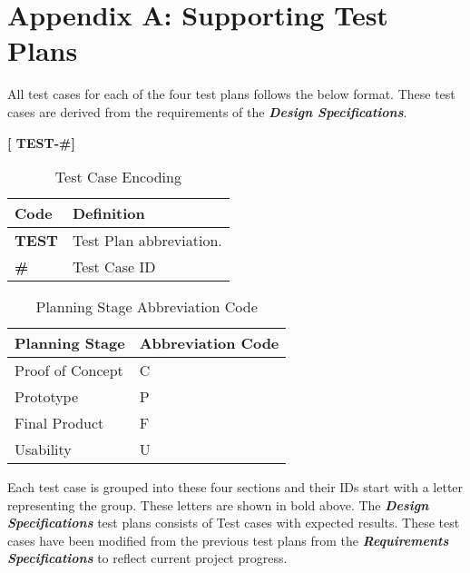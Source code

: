 

\setcounter{section}{8}
\section{Appendix A: Supporting Test Plans}
\bigskip


All test cases for each of the four test plans follows the below format. These test cases are derived from the 
requirements of the \textbf{\textit{Design Specifications}}.
\medskip
\begin{center}
	\textbf{[ TEST-\#]} 
\end{center}


\bgroup
\def\arraystretch{1.5}
\begin{table}[H]
\centering
\begin{tabular}{ | m{1cm} | m{13cm}| } 
\hline
\rowcolor{lightgray} \textbf{Code} & \textbf{Definition} \\ 
\hline
 \textbf{TEST} & Test Plan abbreviation. \\ 
\hline
 \textbf{\#} & Test Case ID \\ 
\hline
\end{tabular}
\caption{Test Case Encoding}
\end{table}

\bgroup
\def\arraystretch{1.5}
\begin{table}[H]
\centering
\begin{tabular}{ | m{7cm} | m{7cm}| } 
\hline
\rowcolor{lightgray} \textbf{Planning Stage} & \textbf{Abbreviation Code} \\ 
\hline
 Proof of Concept & C\\ 
\hline
 Prototype & P\\ 
\hline
 Final Product & F\\  
\hline
 Usability & U\\ 
\hline
\end{tabular}
\caption{Planning Stage Abbreviation Code}
\end{table}

Each test case is grouped into these four sections and their IDs start with a letter representing the group. These letters are shown in bold above.
The \textbf{\textit{Design Specifications}} test plans consists of Test cases with expected results. These test cases have been modified from the
previous test plans from the \textbf{\textit{Requirements Specifications}} to reflect current project progress.


\pagebreak

